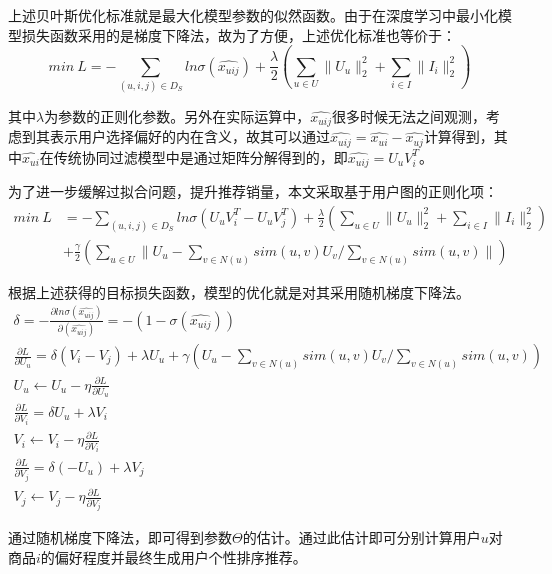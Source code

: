 \documentclass[lang=cn,11pt,a4paper,cite=authoryear]{elegantpaper}
\begin{document}
上述贝叶斯优化标准就是最大化模型参数的似然函数。由于在深度学习中最小化模型损失函数采用的是梯度下降法，故为了方便，上述优化标准也等价于：
\begin{equation}
  min \ L = -\sum_{(u, i, j)\in D_S}ln\sigma(\hat{x_{uij}}) + \frac{\lambda}{2}(\sum_{u \in U}\parallel U_u \parallel_2^2+\sum_{i \in I}\parallel I_i \parallel_2^2)
\end{equation}

其中$\lambda$为参数的正则化参数。另外在实际运算中，$\hat{x_{uij}}$很多时候无法之间观测，考虑到其表示用户选择偏好的内在含义，故其可以通过$\hat{x_{uij}} = \hat{x_{ui}}-\hat{x_{uj}}$计算得到，其中$\hat{x_{ui}}$在传统协同过滤模型中是通过矩阵分解得到的，即$\hat{x_{uij}} = U_uV_i^T$。

为了进一步缓解过拟合问题，提升推荐销量，本文采取基于用户图的正则化项：
\begin{equation}
  \begin{split}
    min \ L &= -\sum_{(u, i, j)\in D_S}ln\sigma(U_uV_i^T-U_uV_j^T) + \frac{\lambda}{2}(\sum_{u \in U}\parallel U_u \parallel_2^2+\sum_{i \in I}\parallel I_i \parallel_2^2) \\
    &+\frac{\gamma}{2}(\sum_{u\in U}\parallel U_u-\sum_{v\in N(u)}sim(u,v)U_v / \sum_{v\in N(u)}sim(u,v) \parallel)
  \end{split}
\end{equation}

根据上述获得的目标损失函数，模型的优化就是对其采用随机梯度下降法。
\begin{gather}
  \delta = -\frac{\partial ln\sigma(\hat{x_{uij}})}{\partial(\hat{x_{uij}})} = -(1-\sigma (\hat{x_{uij}})) \\
  \frac{\partial L}{\partial U_u} = \delta(V_i-V_j)+\lambda U_u+\gamma(U_u-\sum_{v\in N(u)}sim(u,v)U_v / \sum_{v\in N(u)}sim(u,v)) \\
  U_u \leftarrow U_u - \eta \frac{\partial L}{\partial U_u} \\
  \frac{\partial L}{\partial V_i} = \delta U_u+\lambda V_i \\
  V_i \leftarrow V_i - \eta \frac{\partial L}{\partial V_i} \\
  \frac{\partial L}{\partial V_j} = \delta (-U_u)+\lambda V_j \\
  V_j \leftarrow V_j - \eta \frac{\partial L}{\partial V_j} 
\end{gather}

通过随机梯度下降法，即可得到参数$\Theta$的估计。通过此估计即可分别计算用户$u$对商品$i$的偏好程度并最终生成用户个性排序推荐。
\end{document}
